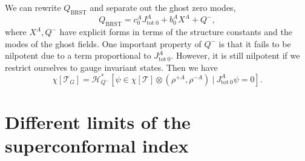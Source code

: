 \documentclass[a4paper,11pt]{article}
\begin{document}
We can rewrite $Q_\mathrm{BRST}$ and separate out the ghost zero modes,
\begin{equation}
    Q_\mathrm{BRST} = c_0^A J^A_{\mathrm{tot}~0} + b_0^A X^A + Q^-,
\end{equation}
where $X^A, Q^-$ have explicit forms in terms of the structure constants and the modes of the ghost fields. One important property of $Q^-$ is that it fails to be nilpotent due to a term proportional to $J^A_{\mathrm{tot}~0}$. However, it is still nilpotent if we restrict ourselves to gauge invariant states. Then we have
\begin{equation}
    \chi[\mathcal{T}_G] = \mathcal{H}^*_{Q^-}[\psi \in \chi[\mathcal{T}] \otimes (\rho^{+A}, \rho^{-A}) \:|\: J^A_{\mathrm{tot}~0} \psi = 0].
\end{equation}




\appendix
\section{Different limits of the superconformal index}











\end{document}
